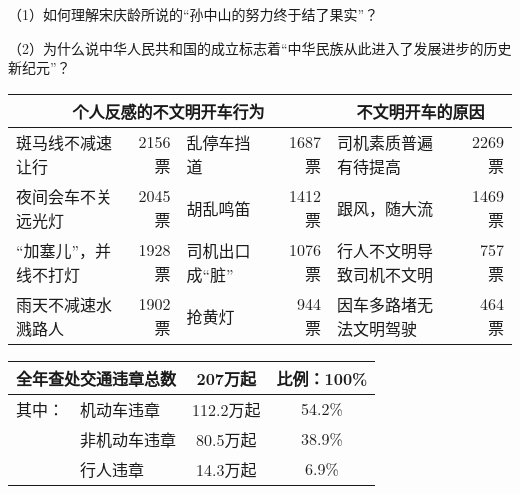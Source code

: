 \qquad {}

\begin{flushright}\end{flushright}

（1）如何理解宋庆龄所说的“孙中山的努力终于结了果实”？

（2）为什么说中华人民共和国的成立标志着“中华民族从此进入了发展进步的历史新纪元”？

\clearpage


\qquad {}

\qquad {}

\begin{center}\end{center}

\begin{center}
	\begin{tabular}{|l r|l r|l r|}
	\hline
	\multicolumn{4}{|c|}{个人反感的不文明开车行为} & \multicolumn{2}{|c|}{不文明开车的原因}\\
	\hline
	斑马线不减速让行 & 2156票 & 乱停车挡道 & 1687票 & 司机素质普遍有待提高 & 2269票\\
	\hline
	夜间会车不关远光灯 & 2045票 & 胡乱鸣笛 & 1412票 & 跟风，随大流 & 1469票\\
	\hline
	“加塞儿”，并线不打灯 & 1928票 & 司机出口成“脏” & 1076票 & 行人不文明导致司机不文明 & 757票\\
	\hline
	雨天不减速水溅路人 & 1902票 & 抢黄灯 & 944票 & 因车多路堵无法文明驾驶 & 464票\\
	\hline
	\end{tabular}
\end{center}

\begin{center}\end{center}

\begin{center}
	\begin{tabular}{|r l|c|c|}
	\hline
	\multicolumn{2}{|c|}{全年查处交通违章总数} & 207万起 & 比例：100\%\\
	\hline
	其中：&机动车违章&112.2万起&54.2\%\\
	\hline
	&非机动车违章&80.5万起&38.9\%\\
	\hline
	&行人违章&14.3万起&6.9\%\\
	\hline
	\end{tabular}
\end{center}

